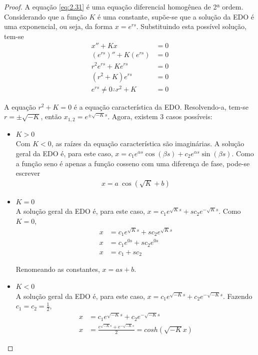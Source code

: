 \begin{proof}
	A equação \eqref{eq:2.31} é uma equação diferencial homogênea de 2ª ordem. Considerando que a função $K$ é uma constante, supõe-se que a solução da EDO é uma exponencial, 		ou seja, da forma $x=e^{rs}$. Substituindo esta possível solução, tem-se
	\begin{align*}
		x'' + Kx &=0\\
		(e^{rs})'' + K(e^{rs}) &= 0\\
		r^2e^{rs} + Ke^{rs}&=0\\
		(r^2 + K)e^{rs} &=0\\
		e^{rs} \neq 0 \therefore r^2 + K &= 0
	\end{align*}
	
	A equação $r^2 + K = 0$ é a equação característica da EDO. Resolvendo-a, tem-se $r = \pm \sqrt{-K}$, então $x_{1,2} = e^{\pm\sqrt{-K}s}$. Agora, existem 3 casos possíveis:
	\begin{itemize}
		\item $K>0$\\
			
		Com $K<0$, as raízes da equação característica são imaginárias. A solução geral da EDO é, para este caso, $x = c_1e^{\alpha s}\cos(\beta s) + c_2e^{\alpha s}\sin(\beta s)$. Como a função seno é apenas a função cosseno com uma diferença de fase, pode-se escrever
        \begin{align*}
        	x = a \ \cos(\sqrt{K}+b)
        \end{align*}
			
		\item $K = 0$\\
		
		A solução geral da EDO é, para este caso, $x = c_1e^{\sqrt{K}s} + sc_2e^{-\sqrt{K}s}$. Como $K=0$, 
		\begin{align*}
            x &= c_1e^{\sqrt{K}s} + sc_2e^{\sqrt{K}s}\\
            x &= c_1e^{0s} + sc_2e^{0s}\\
            x &= c_1 + sc_2
		\end{align*}
		
		Renomeando as constantes, $x = as + b$.

		\item $K < 0$\\
				
		A solução geral da EDO é, para este caso, $x = c_1e^{\sqrt{-K}s} + c_2e^{-\sqrt{-K}s}$. Fazendo $c_1=c_2=\frac{1}{2}$,
		\begin{align*}
            x &= c_1e^{\sqrt{-K}s} + c_2e^{-\sqrt{-K}s}\\
            x &= \frac{e^{\sqrt{-K}s} + e^{-\sqrt{-K}s}}{2} = cosh(\sqrt{-K}x)
		\end{align*}
				

\end{itemize}
\end{proof}
